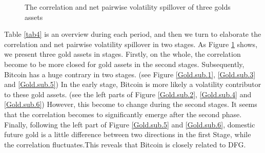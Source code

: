 \documentclass[review]{elsarticle}
\begin{document}
\begin{figure}[H]
	
	
	\caption{The correlation and net pairwise volatility spillover of three golds assets}
	\label{Gold.main}
\end{figure}


Table \ref{tab4} is an overview during each period, and then we turn to elaborate the correlation and net pairwise volatility spillover in two stages. As Figure \ref{Gold.main} shows, we present three gold assets in stages. Firstly, on the whole, the correlation become to be more closed for gold assets in the second stages. Subsequently, Bitcoin has a huge contrary in two stages. (see Figure \ref{Gold.sub.1}, \ref{Gold.sub.3} and \ref{Gold.sub.5}) In the early stage, Bitcoin is more likely a volatility contributor to these gold assets. (see the left parts of Figure \ref{Gold.sub.2}, \ref{Gold.sub.4} and \ref{Gold.sub.6}) However, this become to change during the second stages. It seems that the correlation becomes to significantly emerge after the second phase. Finally, following the left part of Figure \ref{Gold.sub.5} and \ref{Gold.sub.6}, domestic future gold is a little difference between two directions in the first Stage, while the correlation fluctuates.This reveals that Bitcoin is closely related to DFG.
\end{document}
